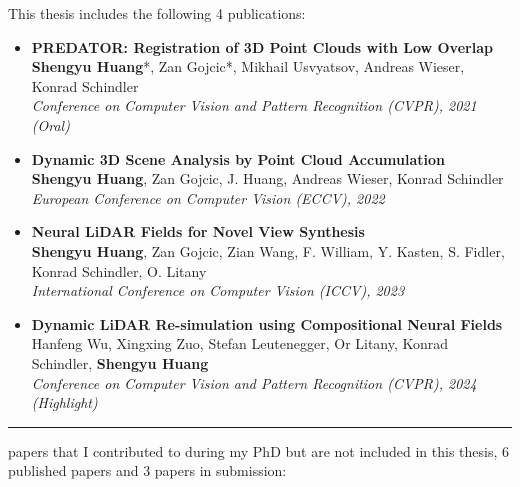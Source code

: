 This thesis includes the following 4 publications:
\begin{itemize}
    \item \noindent\textbf{ PREDATOR: Registration of 3D Point Clouds with Low Overlap} \\[0.5em]
    \textbf{Shengyu Huang}*, Zan Gojcic*, Mikhail Usvyatsov, Andreas Wieser, Konrad Schindler \\
    \textit{Conference on Computer Vision and Pattern Recognition (CVPR), 2021 (Oral)}
    
    \item \noindent\textbf{ Dynamic 3D Scene Analysis by Point Cloud Accumulation} \\[0.5em]
    \textbf{Shengyu Huang}, Zan Gojcic, J. Huang, Andreas Wieser, Konrad Schindler \\
    \textit{European Conference on Computer Vision (ECCV), 2022}
    
    \item \noindent\textbf{ Neural LiDAR Fields for Novel View Synthesis} \\[0.5em]
    \textbf{Shengyu Huang}, Zan Gojcic, Zian Wang, F. William, Y. Kasten, S. Fidler, Konrad Schindler, O. Litany \\
    \textit{International Conference on Computer Vision (ICCV), 2023}
    
    \item \noindent\textbf{ Dynamic LiDAR Re-simulation using Compositional Neural Fields} \\[0.5em]
    Hanfeng Wu, Xingxing Zuo, Stefan Leutenegger, Or Litany, Konrad Schindler, \textbf{Shengyu Huang} \\
    \textit{Conference on Computer Vision and Pattern Recognition (CVPR), 2024 (Highlight)}
\end{itemize}

\vspace{1em}
\hrule
\vspace{1em}

 papers that I contributed to during my PhD but are not included in this thesis, 6 published papers and 3 papers in submission:

